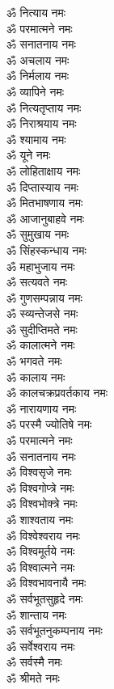 \begin{multicols}{2}
\begin{flushleft}
ॐ नित्याय नमः\\
ॐ परमात्मने नमः\\
ॐ सनातनाय नमः\hfill{}\\
ॐ अचलाय नमः\\
ॐ निर्मलाय नमः\\
ॐ व्यापिने नमः\\
ॐ नित्यतृप्ताय नमः\\
ॐ निराश्रयाय नमः\\
ॐ श्यामाय नमः\\
ॐ यूने नमः\\
ॐ लोहिताक्षाय नमः\\
ॐ दिप्तास्याय नमः\\
ॐ मितभाषणाय नमः\hfill{}\\
ॐ आजानुबाहवे नमः\\
ॐ सुमुखाय नमः\\
ॐ सिंहस्कन्धाय नमः\\
ॐ महाभुजाय नमः\\
ॐ सत्यवते नमः\\
ॐ गुणसम्पन्नाय नमः\\
ॐ स्व्यन्तेजसे नमः\\
ॐ सुदीप्तिमते नमः\\
ॐ कालात्मने नमः\\
ॐ भगवते नमः\hfill{}\\
ॐ कालाय नमः\\
ॐ कालचक्रप्रवर्तकाय नमः\\
ॐ नारायणाय नमः\\
ॐ परस्मै ज्योतिषे नमः\\
ॐ परमात्मने नमः\\
ॐ सनातनाय नमः\\
ॐ विश्वसृजे नमः\\
ॐ विश्वगोप्त्रे नमः\\
ॐ विश्वभोक्त्रे नमः\\
ॐ शाश्वताय नमः\hfill{}\\
ॐ विश्वेश्वराय नमः\\
ॐ विश्वमूर्तये नमः\\
ॐ विश्वात्मने नमः\\
ॐ विश्वभावनायै नमः\\
ॐ सर्वभूतसुहृदे नमः\\
ॐ शान्ताय नमः\\
ॐ सर्वभूतनुकम्पनाय नमः\\
ॐ सर्वेश्वराय नमः\\
ॐ सर्वस्मै नमः\\
ॐ श्रीमते नमः\hfill{}\\

\end{flushleft}
\end{multicols}
